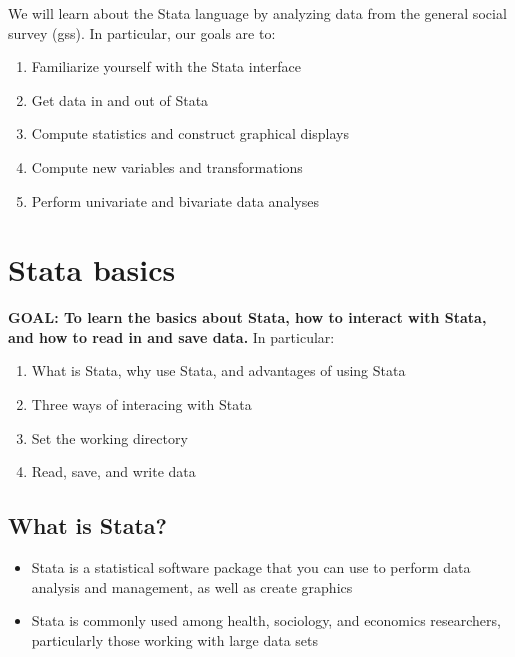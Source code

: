 \documentclass[
]{book}
\providecommand{\tightlist}{%
  \setlength{\itemsep}{0pt}\setlength{\parskip}{0pt}}
\begin{document}
\begin{alert}

We will learn about the Stata language by analyzing data from the general social survey (gss).
In particular, our goals are to:

\begin{enumerate}
\def\labelenumi{\arabic{enumi}.}
\tightlist
\item
  Familiarize yourself with the Stata interface
\item
  Get data in and out of Stata
\item
  Compute statistics and construct graphical displays
\item
  Compute new variables and transformations
\item
  Perform univariate and bivariate data analyses
\end{enumerate}

\end{alert}

\hypertarget{stata-basics}{%
\section{Stata basics}\label{stata-basics}}

\begin{alert}

\textbf{GOAL: To learn the basics about Stata, how to interact with Stata, and how to read in and save data.} In particular:

\begin{enumerate}
\def\labelenumi{\arabic{enumi}.}
\tightlist
\item
  What is Stata, why use Stata, and advantages of using Stata
\item
  Three ways of interacing with Stata
\item
  Set the working directory
\item
  Read, save, and write data
\end{enumerate}

\end{alert}

\hypertarget{what-is-stata}{%
\subsection{What is Stata?}\label{what-is-stata}}

\begin{itemize}
\tightlist
\item
  Stata is a statistical software package that you can use to perform data analysis and management, as well as create graphics
\item
  Stata is commonly used among health, sociology, and economics researchers, particularly those working with large data sets
\end{itemize}
\end{document}
